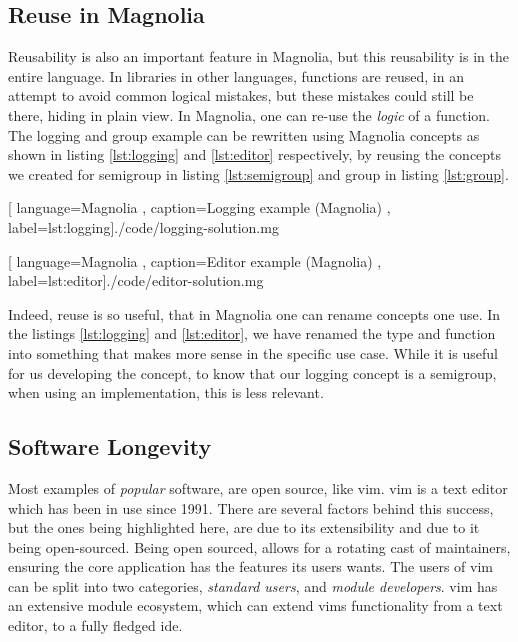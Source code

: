 \subsection{Reuse in Magnolia}

Reusability is also an important feature in Magnolia, but this reusability is in
the entire language. In libraries in other languages, functions are reused, in
an attempt to avoid common logical mistakes, but these mistakes could still be
there, hiding in plain view. In Magnolia, one can re-use the \textit{logic} of a
function. The logging and group example can be rewritten using Magnolia concepts
as shown in listing \ref{lst:logging} and \ref{lst:editor} respectively, by
reusing the concepts we created for semigroup in listing \ref{lst:semigroup} and group
in listing \ref{lst:group}.

\begin{center}
  
    [ language=Magnolia
    , caption={Logging example (Magnolia)}
    , label=lst:logging]{./code/logging-solution.mg}
\end{center}

\begin{center}
  
    [ language=Magnolia
    , caption={Editor example (Magnolia)}
    , label=lst:editor]{./code/editor-solution.mg}
\end{center}

Indeed, reuse is so useful, that in Magnolia one can rename concepts one use.
In the listings \ref{lst:logging} and \ref{lst:editor}, we have renamed the type
and function into something that makes more sense in the specific use case.
While it is useful for us developing the concept, to know that our logging
concept is a semigroup, when using an implementation, this is less relevant.

\subsection{Software Longevity}

Most examples of \textit{popular} software, are open source, like \gls{vim}.
\gls{vim} is a text editor which has been in use since 1991. There are several
factors behind this success, but the ones being highlighted here, are due to its
extensibility and due to it being open-sourced. Being open sourced, allows for a
rotating cast of maintainers, ensuring the core application has the features its
users wants. The users of \gls{vim} can be split into two categories,
\textit{standard users}, and \textit{module developers}. \gls{vim} has an
extensive module ecosystem, which can extend \gls{vim}s functionality from a
text editor, to a fully fledged \gls{ide}.

